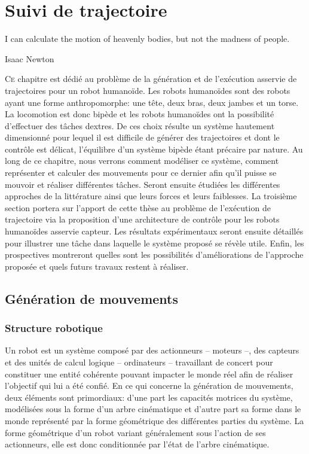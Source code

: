 \chapter{Suivi de trajectoire}
\label{chap:suivi}


\epigraph{\foreignlanguage{USenglish}{I can calculate the motion of
    heavenly bodies, but not the madness of people.}}{Isaac Newton}
\clearpage

\lettrine[lines=2, lraise=0.1, nindent=0em, slope=-.5em]%
{C}{e} chapitre est dédié au problème de la génération et de
l'exécution asservie de trajectoires pour un robot humanoïde. Les
robots humanoïdes sont des robots ayant une forme anthropomorphe:
une tête, deux bras, deux jambes et un torse. La locomotion est donc
bipède et les robots humanoïdes ont la possibilité d'effectuer des
tâches dextres. De ces choix résulte un système hautement dimensionné
pour lequel il est difficile de générer des trajectoires et dont le
contrôle est délicat, l'équilibre d'un système bipède étant précaire
par nature. Au long de ce chapitre, nous verrons comment modéliser ce
système, comment représenter et calculer des mouvements pour ce
dernier afin qu'il puisse se mouvoir et réaliser différentes
tâches. Seront ensuite étudiées les différentes approches de la
littérature ainsi que leurs forces et leurs faiblesses. La troisième
section portera sur l'apport de cette thèse au problème de l'exécution
de trajectoire via la proposition d'une architecture de contrôle pour
les robots humanoïdes asservie capteur. Les résultats expérimentaux
seront ensuite détaillés pour illustrer une tâche dans laquelle le
système proposé se révèle utile. Enfin, les prospectives montreront
quelles sont les possibilités d'améliorations de l'approche proposée
et quels futurs travaux restent à réaliser.

\section{Génération de mouvements}
\subsection{Structure robotique}

Un robot est un système composé par des actionneurs -- moteurs --, des
capteurs et des unités de calcul logique -- ordinateurs -- travaillant
de concert pour constituer une entité cohérente pouvant impacter le
monde réel afin de réaliser l'objectif qui lui a été confié. En ce qui
concerne la génération de mouvements, deux éléments sont primordiaux:
d'une part les capacités motrices du système, modélisées sous la forme
d'un arbre cinématique et d'autre part sa forme dans le monde
représenté par la forme géométrique des différentes parties du
système. La forme géométrique d'un robot variant généralement sous
l'action de ses actionneurs, elle est donc conditionnée par l'état de
l'arbre cinématique.

